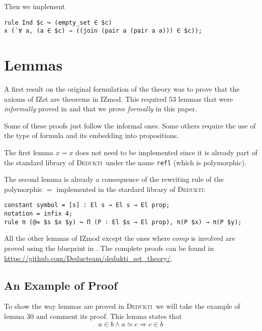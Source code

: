\documentclass[submission,copyright,creativecommons]{eptcs}
\def\imp{\mathbin{\Rightarrow}}
\def\conj{\mathbin{\wedge}}
\newcommand{\dedukti}{\textsc{Dedukti}}
\begin{document}
Then we implement

\begin{lstlisting}
rule Ind $c ↪ (empty_set ∈ $c) 
∧ (`∀ a, (a ∈ $c) ⇒ ((join (pair a (pair a a))) ∈ $c));
\end{lstlisting}


\section{Lemmas}

A first result on the original formulation of the theory was to prove that the axioms of IZst are theorems in IZmod. This required 53 lemmas that were \textit{informally} proved in \cite[see Tables 4 and 5]{zermodulo} and that we prove \textit{formally} in this paper.

Some of these proofs just follow the informal ones. Some others require the use of the type of formula and its embedding into propositions. 

The first lemma $x=x$ does not need to be implemented since it is already part of the standard library of \dedukti \ under the name \texttt{refl} (which is polymorphic).

The second lemma is already a consequence of the rewriting rule of the polymorphic $=$ implemented in the stardard library of \dedukti: 
\begin{lstlisting}
constant symbol = [s] : El s → El s → El prop;
notation = infix 4;
rule π (@= $s $x $y) ↪ Π (P : El $s → El prop), π(P $x) → π(P $y);
\end{lstlisting}

All the other lemmas of IZmod except the ones where $comp$ is involved are proved using the blueprint in \cite[see Proposition 1]{zermodulo53}. The complete proofs can be found in \url{https://github.com/Deducteam/dedukti_set_theory/}.

\subsection{An Example of Proof}

To show the way lemmas are proved in \dedukti ~we will take the example of lemma 30 and comment its proof. This lemma states that $$ a \in b \conj a \simeq c \imp c \in b $$
\end{document}
